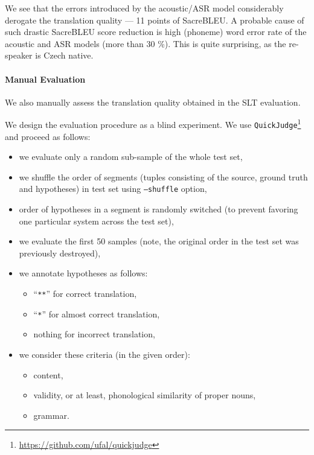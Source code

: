 We see that the errors introduced by the acoustic/ASR model considerably derogate the translation quality --- 11 points of SacreBLEU. A probable cause of such drastic SacreBLEU score reduction is high (phoneme) word error rate of the acoustic and ASR models (more than 30 \%). This is quite surprising, as the re-speaker is Czech native.

\paragraph{Manual Evaluation}
We also manually assess the translation quality obtained in the SLT evaluation.

We design the evaluation procedure as a blind experiment. We use \texttt{QuickJudge}\footnote{\url{https://github.com/ufal/quickjudge}} and proceed as follows:

\begin{itemize}
	\item we evaluate only a random sub-sample of the whole test set,
	\item we shuffle the order of segments (tuples consisting of the source, ground truth and hypotheses) in test set using \texttt{--shuffle} option,
	\item order of hypotheses in a segment is randomly switched (to prevent favoring one particular system across the test set),
	\item we evaluate the first 50 samples (note, the original order in the test set was previously destroyed), 
	\item we annotate hypotheses as follows:
	\begin{itemize}
		\item ``\texttt{**}'' for correct translation,
		\item ``\texttt{*}'' for almost correct translation,
		\item nothing for incorrect translation,
	\end{itemize}
	\item we consider these criteria (in the given order):
	\begin{itemize}
		\item content,
		\item validity, or at least, phonological similarity of proper nouns,
		\item grammar.
	\end{itemize}
\end{itemize}

